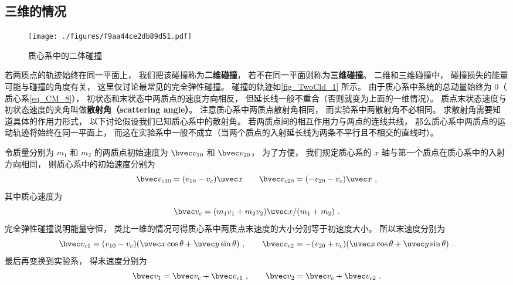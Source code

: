 \subsection{三维的情况}

\begin{figure}[ht]
\centering
\texttt{[image: ./figures/f9aa44ce2db89d51.pdf]}
\caption{质心系中的二体碰撞} \label{fig_TwoCld_1}
\end{figure}

若两质点的轨迹始终在同一平面上， 我们把该碰撞称为\textbf{二维碰撞}， 若不在同一平面则称为\textbf{三维碰撞}。 二维和三维碰撞中， 碰撞损失的能量可能与碰撞的角度有关， 这里仅讨论最常见的完全弹性碰撞。
碰撞的轨迹如\autoref{fig_TwoCld_1} 所示。 由于质心系中系统的总动量始终为 0（ 质心系\autoref{eq_CM_8}），  初状态和末状态中两质点的速度方向相反， 但延长线一般不重合（否则就变为上面的一维情况）。 质点末状态速度与初状态速度的夹角叫做\textbf{散射角（scattering angle）}。 注意质心系中两质点散射角相同， 而实验系中两散射角不必相同。 求散射角需要知道具体的作用力形式， 以下讨论假设我们已知质心系中的散射角。%
若两质点间的相互作用力与两点的连线共线， 那么质心系中两质点的运动轨迹将始终在同一平面上， 而这在实验系中一般不成立（当两个质点的入射延长线为两条不平行且不相交的直线时）。

令质量分别为 $m_1$ 和 $m_2$ 的两质点初始速度为 $\bvec v_{10}$ 和 $\bvec v_{20}$， 为了方便， 我们规定质心系的 $x$ 轴与第一个质点在质心系中的入射方向相同， 则质心系中的初始速度分别为
\begin{equation}
\bvec v_{c10} = (v_{10} - v_c)\uvec x \qquad \bvec v_{c20} = (-v_{20} - v_c) \uvec x~,
\end{equation}
其中质心速度为
\begin{equation}
\bvec v_c = (m_1 v_1 + m_2 v_2)\uvec x/(m_1 + m_2)~.
\end{equation}
完全弹性碰撞说明能量守恒， 类比一维的情况可得质心系中两质点末速度的大小分别等于初速度大小。 所以末速度分别为
\begin{equation}
\bvec v_{c1} = (v_{10} - v_c)(\uvec x\cos\theta + \uvec y\sin\theta)~, \qquad
\bvec v_{c2} = -(v_{20} + v_c)(\uvec x\cos\theta + \uvec y\sin\theta)~.
\end{equation}
最后再变换到实验系， 得末速度分别为
\begin{equation}
\bvec v_1 = \bvec v_c + \bvec v_{c1}~, \qquad
\bvec v_2 = \bvec v_c + \bvec v_{c2}~.
\end{equation}

